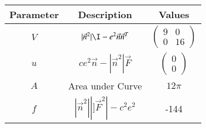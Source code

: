 \begin{tabular}[12pt]{|c|c|c|}
    \hline
    Parameter & Description & Values\\ 
    \hline
    $V$ & $|\vec{n}^{2}|\I-e^2\vec{n}\vec{n}^{T}$ & $\begin{pmatrix} 9 & 0 \\ 0 & 16 \end{pmatrix}$ \\
    \hline
    $u$ & $ce^2\vec{n}-|\vec{n}^2|\vec{F}$ & $\begin{pmatrix} 0 \\ 0 \end{pmatrix}$ \\
    \hline
    $A$ & Area under Curve & $12\pi$ \\ 
    \hline
    $f$ & $|\vec{n}^{2}||]\vec{F}^2|-c^2e^2$ & -144 \\
    \hline
    \end{tabular}
